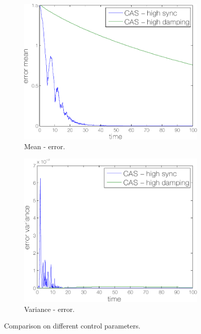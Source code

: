 \begin{figure}
\centering
\begin{subfigure}{0.4\linewidth}
\includegraphics[width=\linewidth]{./images/cas_par_mean}
\caption{Mean - error.}
\label{fig:cas:sims2:mean}
\end{subfigure}
\begin{subfigure}{0.4\linewidth}
\includegraphics[width=\linewidth]{./images/cas_par_var}
\caption{Variance - error.}
\label{fig:cas:sims2:var}
\end{subfigure}
\caption{Comparison on different control parameters.}
\label{fig:cas:sims2}
\end{figure}

